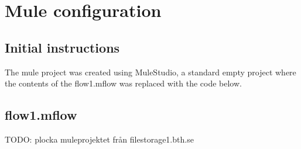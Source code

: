 \section{Mule configuration}
\label{app:mule}

\subsection{Initial instructions}
The mule project was created using MuleStudio, a standard empty project where the contents of the flow1.mflow was replaced with the code below.

\subsection{flow1.mflow}
TODO: plocka muleprojektet från filestorage1.bth.se
%